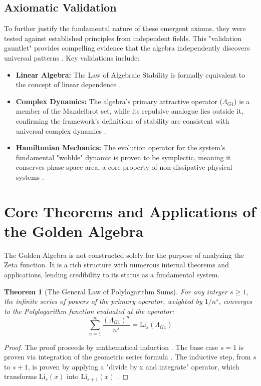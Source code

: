 \documentclass{article}
\theoremstyle{plain}
\newtheorem{theorem}{Theorem}[section]
\theoremstyle{definition}
\theoremstyle{remark}
\begin{document}
\subsection{Axiomatic Validation}
To further justify the fundamental nature of these emergent axioms, they were tested against established principles from independent fields. This "validation gauntlet" provides compelling evidence that the algebra independently discovers universal patterns \textbf{}. Key validations include:
\begin{itemize}
    \item \textbf{Linear Algebra:} The Law of Algebraic Stability is formally equivalent to the concept of linear dependence \textbf{}.
    \item \textbf{Complex Dynamics:} The algebra's primary attractive operator ($\Lambda_{G1}$) is a member of the Mandelbrot set, while its repulsive analogue lies outside it, confirming the framework's definitions of stability are consistent with universal complex dynamics \textbf{}.
    \item \textbf{Hamiltonian Mechanics:} The evolution operator for the system's fundamental "wobble" dynamic is proven to be symplectic, meaning it conserves phase-space area, a core property of non-dissipative physical systems \textbf{}.
\end{itemize}

\section{Core Theorems and Applications of the Golden Algebra}
The Golden Algebra is not constructed solely for the purpose of analyzing the Zeta function. It is a rich structure with numerous internal theorems and applications, lending credibility to its status as a fundamental system.

\begin{theorem}[The General Law of Polylogarithm Sums]
For any integer $s \ge 1$, the infinite series of powers of the primary operator, weighted by $1/n^s$, converges to the Polylogarithm function evaluated at the operator:
$$\sum_{n=1}^{\infty} \frac{(\Lambda_{G1})^n}{n^s} = \mathrm{Li}_s(\Lambda_{G1})$$
\end{theorem}
\begin{proof}
The proof proceeds by mathematical induction \textbf{}. The base case $s=1$ is proven via integration of the geometric series formula \textbf{}. The inductive step, from $s$ to $s+1$, is proven by applying a "divide by x and integrate" operator, which transforms $\mathrm{Li}_s(x)$ into $\mathrm{Li}_{s+1}(x)$ \textbf{}.
\end{proof}
\end{document}
